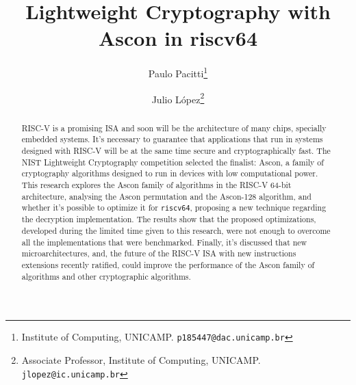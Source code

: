 \documentclass[11pt,twoside]{article}
\begin{document}
% 
\TRMakeCover


%
\pagestyle{myheadings}
\thispagestyle{empty}

%
\title{Lightweight Cryptography with Ascon in riscv64}

\author{Paulo Pacitti\thanks{Institute of Computing, UNICAMP. \texttt{p185447@dac.unicamp.br}} \and
  Julio  López\thanks{Associate Professor, Institute of Computing, UNICAMP. \texttt{jlopez@ic.unicamp.br}}}
\date{}
\maketitle


\begin{abstract}
  RISC-V is a promising ISA and soon will be the architecture of many chips, specially embedded systems. It's necessary to guarantee that applications that run in systems designed with RISC-V will be at the same time secure and cryptographically fast. The NIST Lightweight Cryptography competition selected the finalist: Ascon, a family of cryptography algorithms designed to run in devices with low computational power. This research explores the Ascon family of algorithms in the RISC-V 64-bit architecture, analysing the Ascon permutation and the Ascon-128 algorithm, and whether it's possible to optimize it for \texttt{riscv64}, proposing a new technique regarding the decryption implementation. The results show that the proposed optimizations, developed during the limited time given to this research, were not enough to overcome all the implementations that were benchmarked. Finally, it's discussed that new microarchitectures, and, the future of the RISC-V ISA with new instructions extensions recently ratified, could improve the performance of the Ascon family of algorithms and other cryptographic algorithms.
\end{abstract}
\end{document}
